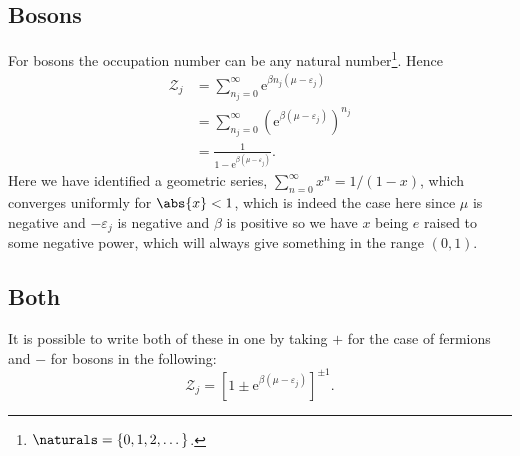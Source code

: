 \documentclass[fleqn]{NotesClass}
\newcommand*{\e}{\mathrm{e}}
\begin{document}
    \subsection{Bosons}
    For bosons the occupation number can be any natural number\footnote{\(\naturals = \{0, 1, 2, \dotsc\}\).}.
    Hence
    \begin{align}
        \mathcal{Z}_j &= \sum_{n_j = 0}^{\infty} \e^{\beta n_j(\mu - \varepsilon_j)}\\
        &= \sum_{n_j = 0}^{\infty} (\e^{\beta(\mu - \varepsilon_j)})^{n_j}\\
        &= \frac{1}{1 - \e^{\beta(\mu - \varepsilon_j)}}.
    \end{align}
    Here we have identified a geometric series, \(\sum_{n = 0}^{\infty} x^n = 1/(1 - x)\), which converges uniformly for \(\abs{x} < 1\), which is indeed the case here since \(\mu\) is negative and \(-\varepsilon_j\) is negative and \(\beta\) is positive so we have \(x\) being \(e\) raised to some negative power, which will always give something in the range \((0, 1)\).
    
    \subsection{Both}
    It is possible to write both of these in one by taking \(+\) for the case of fermions and \(-\) for bosons in the following:
    \begin{equation}\label{eqn:single particle grand canonical partition function}
        \mathcal{Z}_j = [1 \pm \e^{\beta(\mu - \varepsilon_j)}]^{\pm 1}.
    \end{equation}
    
\end{document}
